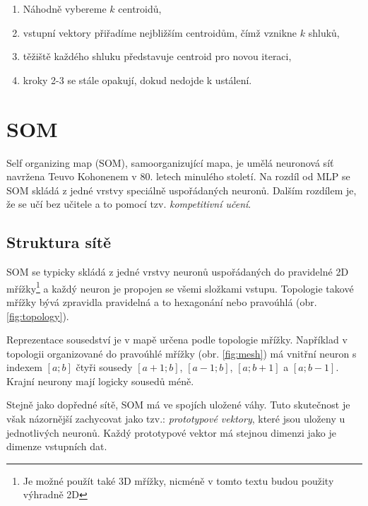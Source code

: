 \documentclass[thesis=M,czech]{FITthesis}[2012/06/26]
\begin{document}
\begin{enumerate}
\item Náhodně vybereme $k$ centroidů,
\item  vstupní vektory přiřadíme nejbližším centroidům, čímž vznikne $k$ shluků,
\item těžiště každého shluku představuje centroid pro novou iteraci,
\item kroky 2-3 se stále opakují, dokud nedojde k ustálení.
\end{enumerate}


\section{SOM}\label{sec:som_teo}
Self organizing map (SOM), samoorganizující mapa, je umělá neuronová síť navržena Teuvo Kohonenem v 80. letech minulého století. Na rozdíl od MLP se SOM skládá z jedné vrstvy speciálně uspořádaných neuronů. Dalším rozdílem je, že se učí bez učitele a to pomocí tzv. \textit{kompetitivní učení}.~\cite{kohonen}

\subsection{Struktura sítě}


SOM se typicky skládá z jedné vrstvy neuronů uspořádaných do pravidelné 2D mřížky\footnote{Je možné použít také 3D mřížky, nicméně v tomto textu budou použity výhradně 2D} a každý neuron je propojen se všemi složkami vstupu. Topologie takové mřížky bývá zpravidla pravidelná a to hexagonání nebo pravoúhlá (obr. \ref{fig:topology}).




Reprezentace sousedství je v mapě určena podle topologie mřížky. Například v topologii organizované do pravoúhlé mřížky (obr. \ref{fig:mesh}) má vnitřní neuron s indexem $[a;b]$ čtyři sousedy $[a+1;b]$, $[a-1;b]$, $[a;b+1]$ a $[a;b-1]$. Krajní neurony mají logicky sousedů méně.

Stejně jako dopředné sítě, SOM má ve spojích uložené váhy. Tuto skutečnost je však názornější zachycovat jako tzv.: \textit{prototypové vektory}, které jsou uloženy u jednotlivých neuronů. Každý prototypové vektor  má stejnou dimenzi jako je dimenze vstupních dat.
\end{document}

